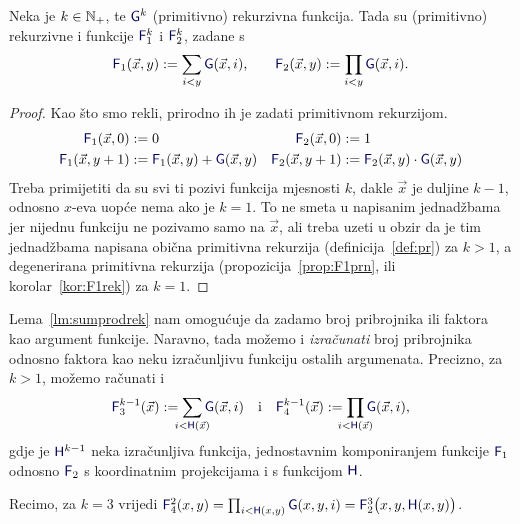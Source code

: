 \begin{lema}[{name=[ograničene sume i produkti čuvaju (primitivnu) rekurzivnost]}]\label{lm:sumprodrek}
    Neka je $k\in{\mathbb N}_+$, te $\f G^k$\! (primitivno) rekurzivna funkcija. Tada su (primitivno) rekurzivne i funkcije $\f F_1^k$ i $\f F_2^k$, zadane s
\begin{equation}
    \f F_1(\vec x,y):=\sum_{i<y}\f G(\vec x,i)\text,\qquad
    \f F_2(\vec x,y):=\prod_{i<y}\f G(\vec x,i)\text.
\end{equation}
\end{lema}
\begin{proof}
    Kao što smo rekli, prirodno ih je zadati primitivnom rekurzijom.
    \begin{align}
        \label{eq:sumG1}\f F_1(\vec x,0)&:=0&\f F_2(\vec x,0)&:=1
        \\
        \label{eq:sumH1}
        \f F_1(\vec x,y+1)&:=\f F_1(\vec x,y)+\f G(\vec x,y)&
        \f F_2(\vec x,y+1)&:=\f F_2(\vec x,y)\cdot\f G(\vec x,y)
    \end{align}
Treba primijetiti da su svi ti pozivi funkcija mjesnosti $k$, dakle $\vec x$ je duljine $k-1$, odnosno $x$-eva uopće nema ako je $k=1$. To ne smeta u napisanim jednadžbama jer nijednu funkciju ne pozivamo samo na $\vec x$, ali treba uzeti u obzir da je tim jednadžbama napisana obična primitivna rekurzija (definicija~\ref{def:pr}) za $k>1$, a degenerirana primitivna rekurzija (propozicija~\ref{prop:F1prn}, ili korolar~\ref{kor:F1rek}) za $k=1$.
\end{proof}

\begin{napomena}[{name=[(primitivno) rekurzivne granice]}]\label{nap:sumprodH}
    Lema~\ref{lm:sumprodrek} nam omogućuje da zadamo broj pribrojnika ili faktora kao argument funkcije. Naravno, tada možemo i \emph{izračunati} broj pribrojnika odnosno faktora kao neku izračunljivu funkciju ostalih argumenata. Precizno, za $k>1$, možemo računati i
\begin{equation}
    \f F_3^{k-1}(\vec x):=\sum_{\mathclap{i<\f H(\vec x)}}\f G(\vec x,i)
    \text{\quad i\quad}\f F_4^{k-1}(\vec x):=\prod_{\mathclap{i<\f H(\vec x)}}\f G(\vec x,i)\text,
\end{equation}
gdje je $\f H^{k-1}$ neka izračunljiva funkcija, jednostavnim komponiranjem funkcije $\f F_1$ odnosno $\f F_2$ s koordinatnim projekcijama i s funkcijom $\f H$.

Recimo, za $k=3$ vrijedi $\f F_4^2(x,y)=\prod_{i<\f H(x,y)}\f G(x,y,i)=\f F_2^3\bigl(x,y,\f H(x,y)\bigr)$.
\end{napomena}

